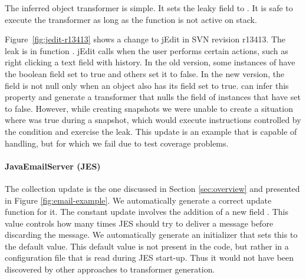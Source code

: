 The inferred object transformer %
is simple. It sets the leaky field to . It is safe to execute the
transformer as long as the  function is not active on
stack.

% 


Figure~\ref{fig:jedit-r13413} shows a change to jEdit in SVN revision r13413.
The leak is in function . jEdit calls
 when the user performs certain actions, such as right
clicking a text field with history.
In the old version, some instances of  have the
boolean field  set to true and others set it to
false. In the new version, the field  is not null only when
an object also has its  field set to true. \TOS can
infer this property and generate a transformer that nulls the
 field of instances that have  set to
false.  However, while creating snapshots we were unable to create a situation where
 was true during a snapshot, 
which would execute
instructions controlled by the condition and exercise the leak.  This
update is an example that \TOS is capable of handling,
but for which we fail due to test coverage problems.

\paragraph*{JavaEmailServer (JES)}  The collection update is the one
discussed in Section \ref{sec:overview} and presented in Figure
\ref{fig:email-example}. We automatically generate a correct update
function for it.  The constant update involves the addition of a new
field .  This value controls how many
times JES should try to deliver a message before discarding the
message.  We automatically generate an initializer that sets this to
the default value.  This default value is not present in the code, but
rather in a configuration file that is read during JES start-up.
Thus it would not have been discovered by other approaches to
transformer generation.

